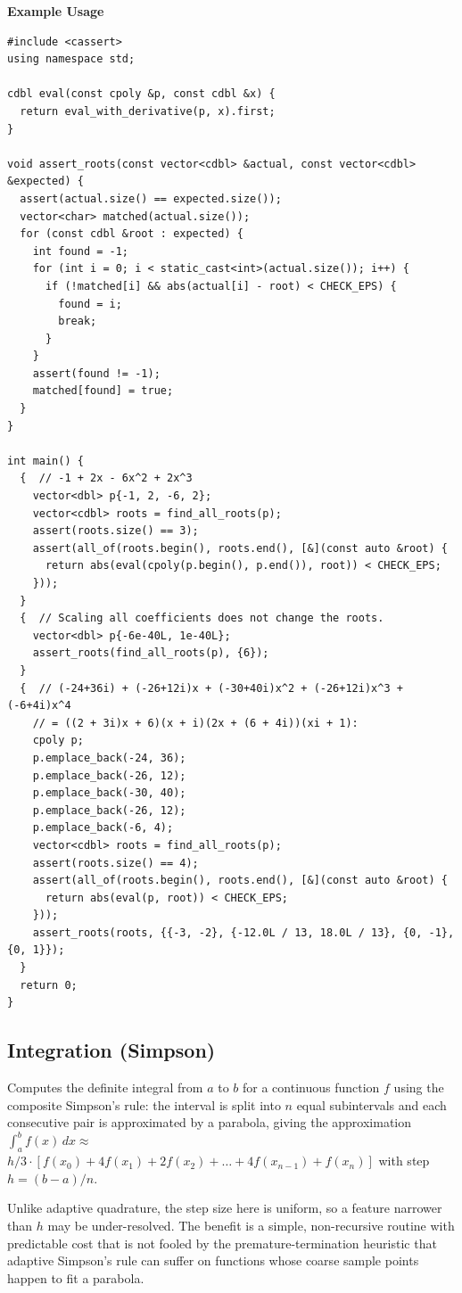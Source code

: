 \textbf{Example Usage}\par
\begin{lstlisting}[style=cpp]
#include <cassert>
using namespace std;

cdbl eval(const cpoly &p, const cdbl &x) {
  return eval_with_derivative(p, x).first;
}

void assert_roots(const vector<cdbl> &actual, const vector<cdbl> &expected) {
  assert(actual.size() == expected.size());
  vector<char> matched(actual.size());
  for (const cdbl &root : expected) {
    int found = -1;
    for (int i = 0; i < static_cast<int>(actual.size()); i++) {
      if (!matched[i] && abs(actual[i] - root) < CHECK_EPS) {
        found = i;
        break;
      }
    }
    assert(found != -1);
    matched[found] = true;
  }
}

int main() {
  {  // -1 + 2x - 6x^2 + 2x^3
    vector<dbl> p{-1, 2, -6, 2};
    vector<cdbl> roots = find_all_roots(p);
    assert(roots.size() == 3);
    assert(all_of(roots.begin(), roots.end(), [&](const auto &root) {
      return abs(eval(cpoly(p.begin(), p.end()), root)) < CHECK_EPS;
    }));
  }
  {  // Scaling all coefficients does not change the roots.
    vector<dbl> p{-6e-40L, 1e-40L};
    assert_roots(find_all_roots(p), {6});
  }
  {  // (-24+36i) + (-26+12i)x + (-30+40i)x^2 + (-26+12i)x^3 + (-6+4i)x^4
    // = ((2 + 3i)x + 6)(x + i)(2x + (6 + 4i))(xi + 1):
    cpoly p;
    p.emplace_back(-24, 36);
    p.emplace_back(-26, 12);
    p.emplace_back(-30, 40);
    p.emplace_back(-26, 12);
    p.emplace_back(-6, 4);
    vector<cdbl> roots = find_all_roots(p);
    assert(roots.size() == 4);
    assert(all_of(roots.begin(), roots.end(), [&](const auto &root) {
      return abs(eval(p, root)) < CHECK_EPS;
    }));
    assert_roots(roots, {{-3, -2}, {-12.0L / 13, 18.0L / 13}, {0, -1}, {0, 1}});
  }
  return 0;
}
\end{lstlisting}
\subsection{Integration (Simpson)}
\label{sec:5.4.6}
Computes the definite integral from $a$ to $b$ for a continuous function $f$ using the composite Simpson's rule: the interval is split into $n$ equal subintervals and each consecutive pair is approximated by a parabola, giving the approximation $\int_{a}^{b} f(x) \,dx \approx$ $h/3 \cdot [f(x_0) + 4f(x_1) + 2f(x_2) + \ldots + 4f(x_{n-1}) + f(x_n)]$ with step $h = (b - a)/n$.

Unlike adaptive quadrature, the step size here is uniform, so a feature narrower than $h$ may be under-resolved. The benefit is a simple, non-recursive routine with predictable cost that is not fooled by the premature-termination heuristic that adaptive Simpson's rule can suffer on functions whose coarse sample points happen to fit a parabola.

